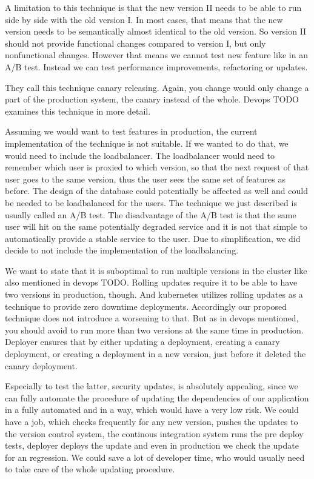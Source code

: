 A limitation to this technique is that the new version II needs to be able to run side by
side with the old version I. In most cases, that means that the new version needs to be
semantically almost identical to the old version. So version II should not provide
functional changes compared to version I, but only nonfunctional changes. However that
means we cannot test new feature like in an A/B test. Instead we can test performance
improvements, refactoring or updates.

They call this technique canary releasing. Again, you change would only change a part of
the production system, the canary instead of the whole. Devops TODO examines this
technique in more detail.

Assuming we would want to test features in production, the current implementation of the
technique is not suitable. If we wanted to do that, we would need to include the
loadbalancer. The loadbalancer would need to remember which user is proxied to which
version, so that the next request of that user goes to the same version, thus the user
sees the same set of features as before. The design of the database could potentially be
affected as well and could be needed to be loadbalanced for the users. The technique we
just described is usually called an A/B test. The disadvantage of the A/B test is that the
same user will hit on the same potentially degraded service and it is not that simple to
automatically provide a stable service to the user. Due to simplification, we did decide
to not include the implementation of the loadbalancing.

We want to state that it is suboptimal to run multiple versions in the cluster like also
mentioned in devops TODO. Rolling updates require it to be able to have two versions in
production, though. And kubernetes utilizes rolling updates as a technique to provide zero
downtime deployments. Accordingly our proposed technique does not introduce a worsening to
that. But as in devops mentioned, you should avoid to run more than two versions at the
same time in production. Deployer ensures that by either updating a deployment, creating a
canary deployment, or creating a deployment in a new version, just before it deleted the
canary deployment.

Especially to test the latter, security updates, is absolutely appealing, since we can
fully automate the procedure of updating the dependencies of our application in a fully
automated and in a way, which would have a very low risk. We could have a job, which
checks frequently for any new version, pushes the updates to the version control system,
the continous integration system runs the pre deploy tests, deployer deploys the update
and even in production we check the update for an regression. We could save a lot of
developer time, who would usually need to take care of the whole updating procedure.

